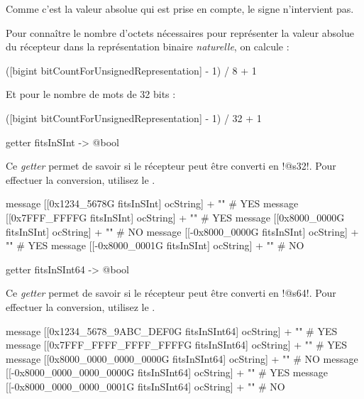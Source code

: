 Comme c'est la valeur absolue qui est prise en compte, le signe n'intervient pas.

Pour connaître le nombre d'octets nécessaires pour représenter la valeur absolue du récepteur dans la représentation binaire \emph{naturelle}, on calcule :
\begin{galgas4}
([bigint bitCountForUnsignedRepresentation] - 1) / 8 + 1
\end{galgas4}

Et pour le nombre de mots de 32 bits :
\begin{galgas4}
([bigint bitCountForUnsignedRepresentation] - 1) / 32 + 1
\end{galgas4}


\begin{galgas4box}
getter fitsInSInt -> @bool
\end{galgas4box}

Ce \emph{getter} permet de savoir si le récepteur peut être converti en \ggsq!@s32!. Pour effectuer la conversion, utilisez le .

\begin{galgas4}
message [[0x1234_5678G fitsInSInt] ocString] + "\n" # YES
message [[0x7FFF_FFFFG fitsInSInt] ocString] + "\n" # YES
message [[0x8000_0000G fitsInSInt] ocString] + "\n" # NO
message [[-0x8000_0000G fitsInSInt] ocString] + "\n" # YES
message [[-0x8000_0001G fitsInSInt] ocString] + "\n" # NO
\end{galgas4}





\begin{galgas4box}
getter fitsInSInt64 -> @bool
\end{galgas4box}

Ce \emph{getter} permet de savoir si le récepteur peut être converti en \ggsq!@s64!. Pour effectuer la conversion, utilisez le .

\begin{galgas4}
message [[0x1234_5678_9ABC_DEF0G fitsInSInt64] ocString] + "\n" # YES
message [[0x7FFF_FFFF_FFFF_FFFFG fitsInSInt64] ocString] + "\n" # YES
message [[0x8000_0000_0000_0000G fitsInSInt64] ocString] + "\n" # NO
message [[-0x8000_0000_0000_0000G fitsInSInt64] ocString] + "\n" # YES
message [[-0x8000_0000_0000_0001G fitsInSInt64] ocString] + "\n" # NO
\end{galgas4}




